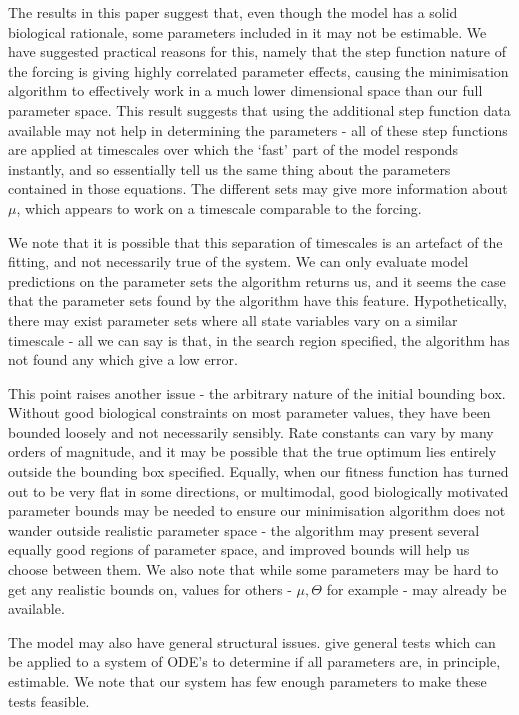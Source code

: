 \documentclass[10pt,journal]{./IEEE_latex_class/IEEEtran}
\begin{document}
 
The results in this paper suggest that, even though the model has a solid biological rationale, some parameters included in it may not be estimable. We have suggested practical reasons for this, namely that the step function nature of the forcing is giving highly correlated parameter effects, causing the minimisation algorithm to effectively work in a much lower dimensional space than our full parameter space. This result suggests that using the additional step function data  available may not help in determining the parameters - all of these step functions are applied at timescales over which the `fast' part of the model responds instantly, and so essentially tell us the same thing about the parameters contained in those equations. The different sets may give more information about $\mu$, which appears to work on a timescale comparable to the forcing.  

We note that it is possible that this separation of timescales is an artefact of the fitting, and not necessarily true of the system. We can only evaluate model predictions on the parameter sets the algorithm returns us, and it seems the case that the parameter sets found by the algorithm have this feature. Hypothetically, there may exist parameter sets where all state variables vary on a similar timescale - all we can say is that, in the search region specified, the algorithm has not found any which give a low error. 

This point raises another issue - the arbitrary nature of the initial bounding box. Without good biological constraints on most parameter values, they have been bounded loosely and not necessarily sensibly. Rate constants can vary by many orders of magnitude, and it may be possible that the true optimum lies entirely outside the bounding box specified. Equally,  when our fitness function has turned out to be very flat in some directions, or multimodal, good biologically motivated parameter bounds may be needed to ensure our minimisation algorithm does not wander outside realistic parameter space - the algorithm may present several equally good regions of parameter space, and improved bounds will help us choose between them. We also note that while some parameters may be hard to get any realistic bounds on, values for others - $\mu, \Theta$ for example - may already be available.

 The model may also have general structural issues. \cite{Mclean2012, Grewal1976} give general tests which can be applied to a system of ODE's to determine if all parameters are, in principle, estimable. We note that our system has few enough parameters to make these tests feasible.
 
\end{document}
